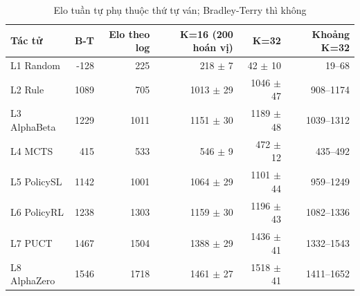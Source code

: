 \begin{table}[H]
  \centering
  \footnotesize
  \caption{Elo tuần tự phụ thuộc thứ tự ván; Bradley-Terry thì không}
  \label{tab:cs-tk-elo}
  \begin{tabular}{lrrrrr}
    \toprule
    Tác tử & B-T & Elo theo log & K=16 (200 hoán vị) & K=32 & Khoảng K=32 \\
    \midrule
    L1 Random & -128 & 225 & 218 $\pm$ 7 & 42 $\pm$ 10 & 19--68 \\
    L2 Rule & 1089 & 705 & 1013 $\pm$ 29 & 1046 $\pm$ 47 & 908--1174 \\
    L3 AlphaBeta & 1229 & 1011 & 1151 $\pm$ 30 & 1189 $\pm$ 48 & 1039--1312 \\
    L4 MCTS & 415 & 533 & 546 $\pm$ 9 & 472 $\pm$ 12 & 435--492 \\
    L5 PolicySL & 1142 & 1001 & 1064 $\pm$ 29 & 1101 $\pm$ 44 & 959--1249 \\
    L6 PolicyRL & 1238 & 1303 & 1159 $\pm$ 30 & 1196 $\pm$ 43 & 1082--1336 \\
    L7 PUCT & 1467 & 1504 & 1388 $\pm$ 29 & 1436 $\pm$ 41 & 1332--1543 \\
    L8 AlphaZero & 1546 & 1718 & 1461 $\pm$ 27 & 1518 $\pm$ 41 & 1411--1652 \\
    \bottomrule
  \end{tabular}
\end{table}
